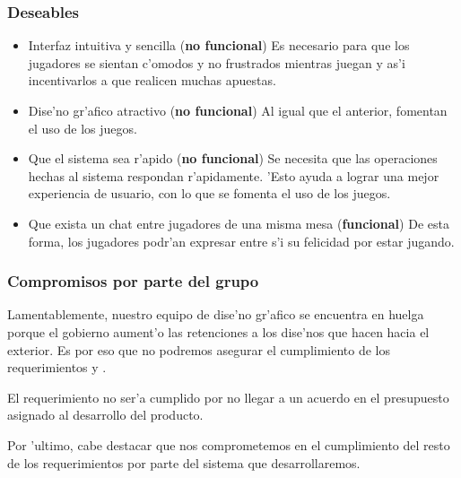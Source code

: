 \subsubsection{Deseables}
\begin{itemize}
    \item Interfaz intuitiva y sencilla (\textbf{no funcional}) Es necesario para que los jugadores se sientan c'omodos y no frustrados mientras juegan y as'i incentivarlos a que realicen muchas apuestas.
    \item Dise'no gr'afico atractivo (\textbf{no funcional}) Al igual que el anterior, fomentan el uso de los juegos.
    \item Que el sistema sea r'apido (\textbf{no funcional}) Se necesita que las operaciones hechas al sistema respondan r'apidamente. 'Esto ayuda a lograr una mejor experiencia de usuario, con lo que se fomenta el uso de los juegos.
    \item Que exista un chat entre jugadores de una misma mesa (\textbf{funcional}) De esta forma, los jugadores podr'an expresar entre s'i su felicidad por estar jugando.
\end{itemize}

\subsubsection{Compromisos por parte del grupo}
Lamentablemente, nuestro equipo de dise'no gr'afico se encuentra en huelga porque el gobierno aument'o las retenciones a los dise'nos que hacen hacia el exterior. Es por eso que no podremos asegurar el cumplimiento de los requerimientos  y . 

El requerimiento  no ser'a cumplido por no llegar a un acuerdo en el presupuesto asignado al desarrollo del producto.

Por 'ultimo, cabe destacar que nos comprometemos en el cumplimiento del resto de los requerimientos por parte del sistema que desarrollaremos.
